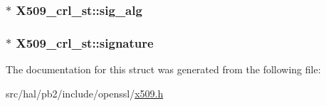 \subsubsection[{\texorpdfstring{sig\+\_\+alg}{sig_alg}}]{$\ast$ X509\+\_\+crl\+\_\+st\+::sig\+\_\+alg}\hypertarget{struct_x509__crl__st_a07ba02ffeeb926141b4aae2f0d03047b}{}\label{struct_x509__crl__st_a07ba02ffeeb926141b4aae2f0d03047b}
\subsubsection[{\texorpdfstring{signature}{signature}}]{$\ast$ X509\+\_\+crl\+\_\+st\+::signature}\hypertarget{struct_x509__crl__st_a9ebc0cad86c7cb4527d94968fe16c608}{}\label{struct_x509__crl__st_a9ebc0cad86c7cb4527d94968fe16c608}


The documentation for this struct was generated from the following file\+:\begin{DoxyCompactItemize}
\item 
src/hal/pb2/include/openssl/\hyperlink{x509_8h}{x509.\+h}\end{DoxyCompactItemize}
